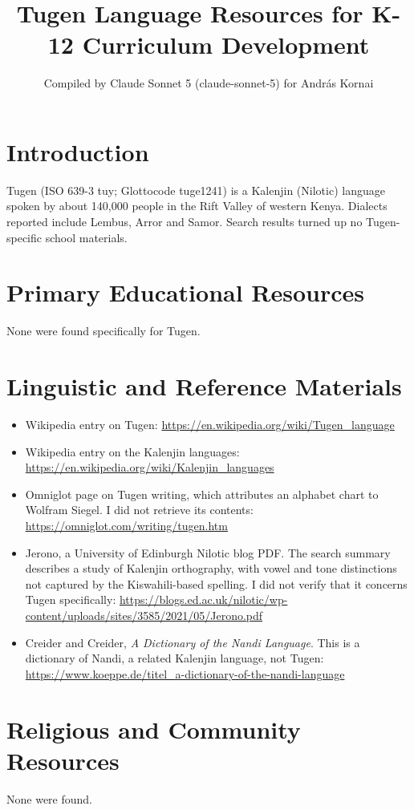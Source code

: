 \documentclass[12pt]{article}
\title{Tugen Language Resources for K-12 Curriculum Development}
\author{Compiled by Claude Sonnet 5 (claude-sonnet-5) for Andr\'as Kornai}
\date{}
\begin{document}
\maketitle

\section{Introduction}
Tugen (ISO 639-3 tuy; Glottocode tuge1241) is a Kalenjin (Nilotic) language spoken by about 140,000 people in the Rift Valley of western Kenya. Dialects reported include Lembus, Arror and Samor. Search results turned up no Tugen-specific school materials.

\section{Primary Educational Resources}
None were found specifically for Tugen.

\section{Linguistic and Reference Materials}
\begin{itemize}
\item Wikipedia entry on Tugen: \url{https://en.wikipedia.org/wiki/Tugen_language}
\item Wikipedia entry on the Kalenjin languages: \url{https://en.wikipedia.org/wiki/Kalenjin_languages}
\item Omniglot page on Tugen writing, which attributes an alphabet chart to Wolfram Siegel. I did not retrieve its contents: \url{https://omniglot.com/writing/tugen.htm}
\item Jerono, a University of Edinburgh Nilotic blog PDF. The search summary describes a study of Kalenjin orthography, with vowel and tone distinctions not captured by the Kiswahili-based spelling. I did not verify that it concerns Tugen specifically: \url{https://blogs.ed.ac.uk/nilotic/wp-content/uploads/sites/3585/2021/05/Jerono.pdf}
\item Creider and Creider, \emph{A Dictionary of the Nandi Language}. This is a dictionary of Nandi, a related Kalenjin language, not Tugen: \url{https://www.koeppe.de/titel_a-dictionary-of-the-nandi-language}
\end{itemize}

\section{Religious and Community Resources}
None were found.
\end{document}
